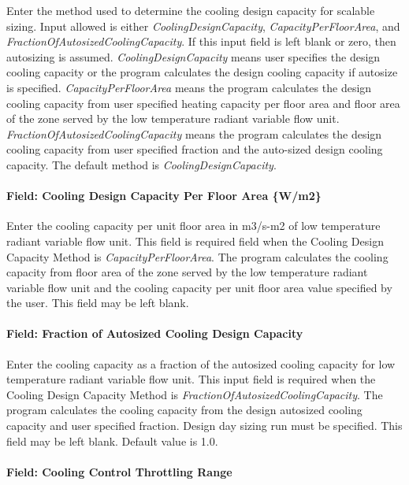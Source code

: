 Enter the method used to determine the cooling design capacity for scalable sizing. Input allowed is either \emph{CoolingDesignCapacity}, \emph{CapacityPerFloorArea}, and \emph{FractionOfAutosizedCoolingCapacity}. If this input field is left blank or zero, then autosizing is assumed. \emph{CoolingDesignCapacity} means user specifies the design cooling capacity or the program calculates the design cooling capacity if autosize is specified. \emph{CapacityPerFloorArea} means the program calculates the design cooling capacity from user specified heating capacity per floor area and floor area of the zone served by the low temperature radiant variable flow unit. \emph{FractionOfAutosizedCoolingCapacity} means the program calculates the design cooling capacity from user specified fraction and the auto-sized design cooling capacity. The default method is \emph{CoolingDesignCapacity}.

\paragraph{Field: Cooling Design Capacity Per Floor Area \{W/m2\}}\label{field-cooling-design-capacity-per-floor-area-wm2-000}

Enter the cooling capacity per unit floor area in m3/s-m2 of low temperature radiant variable flow unit. This field is required field when the Cooling Design Capacity Method is \emph{CapacityPerFloorArea}. The program calculates the cooling capacity from floor area of the zone served by the low temperature radiant variable flow unit and the cooling capacity per unit floor area value specified by the user. This field may be left blank.

\paragraph{Field: Fraction of Autosized Cooling Design Capacity}\label{field-fraction-of-autosized-cooling-design-capacity-000}

Enter the cooling capacity as a fraction of the autosized cooling capacity for low temperature radiant variable flow unit. This input field is required when the Cooling Design Capacity Method is \emph{FractionOfAutosizedCoolingCapacity}. The program calculates the cooling capacity from the design autosized cooling capacity and user specified fraction. Design day sizing run must be specified. This field may be left blank. Default value is 1.0.

\paragraph{Field: Cooling Control Throttling Range}\label{field-cooling-control-throttling-range}

